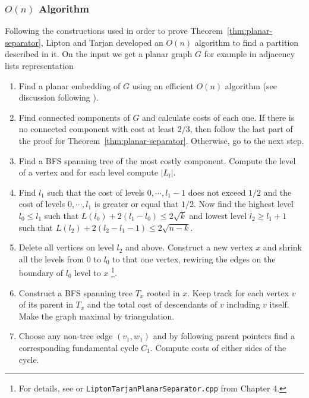 \subsubsection{$O(n)$ Algorithm}
Following the constructions used in order to prove
Theorem~\ref{thm:planar-separator}, Lipton and Tarjan developed an $O(n)$
algorithm to find a partition described in it. On the input we get a planar
graph $G$ for example in adjacency lists representation
\begin{enumerate}
    \item Find a planar embedding of $G$ using an efficient $O(n)$ algorithm
    (see discussion following ).
    \item Find connected components of $G$ and calculate costs of each one. If
        there is no connected component with cost at least $2/3$, then follow the last part of
        the proof for Theorem~\ref{thm:planar-separator}. Otherwise, go to the
        next step.
    \item Find a BFS spanning tree of the most costly component. Compute the
        level of a vertex and for each level compute $|L_l|$.

    \item Find $l_1$ such that the cost of levels $0, \cdots, l_1 - 1$ does not
        exceed $1/2$ and the cost of levels $0, \cdots, l_1$ is greater or equal
        that $1/2$. Now find the highest level $l_0 \leq l_1$ such that
        $L(l_0) + 2(l_1 - l_0) \leq 2 \sqrt{k}$ and lowest level $l_2 \geq l_1 +
        1$ such that $L(l_2) + 2(l_2-l_1-1) \leq 2 \sqrt{n - k}$.

    \item Delete all vertices on level $l_2$ and above. Construct a new vertex
        $x$ and shrink all the levels from 0 to $l_0$ to that one vertex,
        rewiring the edges on the boundary of $l_0$ level to $x$ 
        \footnote{For details, see \cite{liptonSeparatorTheoremPlanar1979} or \texttt{LiptonTarjanPlanarSeparator.cpp}
        from Chapter 4.}. 

    \item Construct a BFS spanning tree $T_x$ rooted in $x$. Keep track for each
        vertex $v$ of its parent in $T_x$ and the total cost of descendants of
        $v$ including $v$ itself. Make the graph maximal by triangulation.

    \item Choose any non-tree edge $(v_1, w_1)$ and by following parent pointers
        find a corresponding fundamental cycle $C_1$. Compute costs of either sides of the
        cycle.


\end{enumerate}

